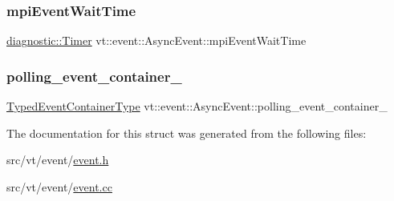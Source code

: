 \mbox{\label{structvt_1_1event_1_1_async_event_a09ed5cc72e0c43fa1de10ccb4effd7df}} 
\subsubsection{\texorpdfstring{mpi\+Event\+Wait\+Time}{mpiEventWaitTime}}
{\footnotesize\ttfamily \hyperlink{namespacevt_1_1diagnostic_a84795feb3d3500ee2d7d59248499efb8}{diagnostic\+::\+Timer} vt\+::event\+::\+Async\+Event\+::mpi\+Event\+Wait\+Time\hspace{0.3cm}{\ttfamily [private]}}

\mbox{\label{structvt_1_1event_1_1_async_event_aa622d9e34d70a6de6ca74b16e65c1bae}} 
\subsubsection{\texorpdfstring{polling\+\_\+event\+\_\+container\+\_\+}{polling\_event\_container\_}}
{\footnotesize\ttfamily \hyperlink{structvt_1_1event_1_1_async_event_af0397f32fb9d7dd136c544737eeb7796}{Typed\+Event\+Container\+Type} vt\+::event\+::\+Async\+Event\+::polling\+\_\+event\+\_\+container\+\_\+\hspace{0.3cm}{\ttfamily [private]}}



The documentation for this struct was generated from the following files\+:\begin{DoxyCompactItemize}
\item 
src/vt/event/\hyperlink{event_8h}{event.\+h}\item 
src/vt/event/\hyperlink{event_8cc}{event.\+cc}\end{DoxyCompactItemize}
